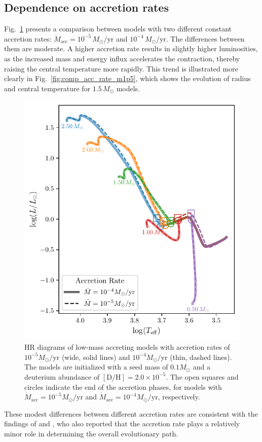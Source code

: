 \documentclass[12pt,a4paper]{article}
\newcommand{\mr}{\mathrm}
\begin{document}
\subsection{Dependence on accretion rates}
\label{sec:accretion_rate}

Fig.~\ref{fig:comp_acc_rate} presents a comparison between models with two different constant accretion rates: $\dot{M}_\mr{acc} = 10^{-5}\,M_\odot/\mr{yr}$ and $10^{-4}\,M_\odot/\mr{yr}$. The differences between them are moderate. A higher accretion rate results in slightly higher luminosities, as the increased mass and energy influx accelerates the contraction, thereby raising the central temperature more rapidly. This trend is illustrated more clearly in Fig.~\ref{fig:comp_acc_rate_m1p5}, which shows the evolution of radius and central temperature for $1.5\,M_\odot$ models. 

\begin{figure}
  \centering  
  \includegraphics[width=.49\textwidth,keepaspectratio]{cmp_accretionrate.pdf}
  \caption{HR diagrams of low-mass accreting models with accretion rates of $10^{-5} M_\odot/\mr{yr}$ (wide, solid lines) and $10^{-4} M_\odot/\mr{yr}$ (thin, dashed lines). The models are initialized with a seed mass of $0.1 M_\odot$ and a deuterium abundance of $[\mr{D/H}] = 2.0\times 10^{-5}$. The open squares and circles indicate the end of the accretion phases, for models with $\dot{M}_\mr{acc} = 10^{-5} M_\odot/\mr{yr}$ and $\dot{M}_\mr{acc} = 10^{-4} M_\odot/\mr{yr}$, respectively.} \label{fig:comp_acc_rate}
\end{figure}

These modest differences between different accretion rates are consistent with the findings of \textcite{HosokawaEtAl2011} and \textcite{KunitomoEtAl2017}, who also reported that the accretion rate plays a relatively minor role in determining the overall evolutionary path.
\end{document}
